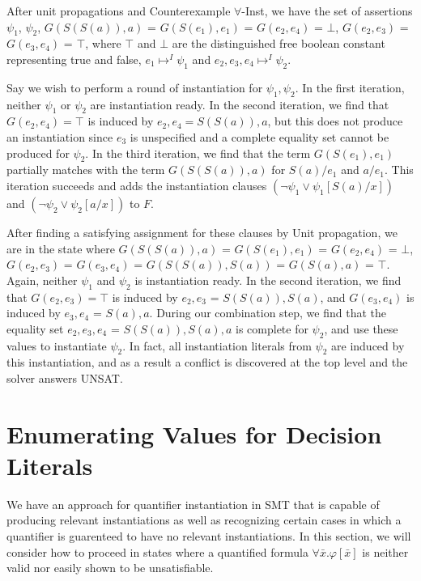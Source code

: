 \documentclass{llncs}
\begin{document}
After unit propagations and Counterexample $\forall$-Inst, we have the set of assertions $\psi_1$, $\psi_2$, $G( S(S(a)), a)$ = $G( S(e_1), e_1)$ = $G( e_2, e_4 )$ = $\bot$, $G( e_2, e_3 )$ = $G( e_3, e_4 )$ = $\top$, where $\top$ and $\bot$ are the distinguished free boolean constant representing true and false, $e_1 \mapsto^I \psi_1$ and $e_2, e_3, e_4 \mapsto^I \psi_2$.

Say we wish to perform a round of instantiation for $\psi_1, \psi_2$.
In the first iteration, neither $\psi_1$ or $\psi_2$ are instantiation ready.
In the second iteration, we find that $G( e_2, e_4 ) = \top$ is induced by $e_2, e_4 = S(S(a)), a$, but this does not produce an instantiation since $e_3$ is unspecified and a complete equality set cannot be produced for $\psi_2$.
In the third iteration, we find that the term $G( S(e_1), e_1)$ partially matches with the term $G( S(S(a)), a)$ for $S(a)/e_1$ and $a/e_1$.
This iteration succeeds and adds the instantiation clauses $( \neg \psi_1 \vee \psi_1[S(a)/x])$ and $( \neg \psi_2 \vee \psi_2[a/x])$ to $F$.

After finding a satisfying assignment for these clauses by Unit propagation, we are in the state where $G( S(S(a)), a)$ = $G( S(e_1), e_1)$ = $G( e_2, e_4 )$ = $\bot$, $G( e_2, e_3 )$ = $G( e_3, e_4 )$ = $G(S(S(a)), S(a))$ = $G( S(a), a)$ = $\top$.
Again, neither $\psi_1$ and $\psi_2$ is instantiation ready.
In the second iteration, we find that $G( e_2, e_3 ) = \top$ is induced by $e_2,e_3$ = $S(S(a)), S(a)$, and $G( e_3, e_4 )$ is induced by $e_3, e_4$ = $S(a), a$.
During our combination step, we find that the equality set $e_2, e_3, e_4$ = $S(S(a)), S(a), a$ is complete for $\psi_2$, and use these values to instantiate $\psi_2$.
In fact, all instantiation literals from $\psi_2$ are induced by this instantiation, and as a result a conflict is discovered at the top level and the solver answers UNSAT.

\section{Enumerating Values for Decision Literals}

We have an approach for quantifier instantiation in SMT that is capable of producing relevant instantiations as well as recognizing certain cases in which a quantifier is guarenteed to have no relevant instantiations. 
In this section, we will consider how to proceed in states where a quantified formula $\forall \bar{x}. \varphi[ \bar{x} ]$ is neither valid nor easily shown to be unsatisfiable. \\
\end{document}
